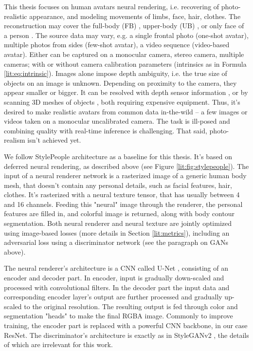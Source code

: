 This thesis focuses on human avatars neural rendering, i.e. recovering of photo-realistic appearance, and modeling movements of limbs, face, hair, clothes. The reconstruction may cover the full-body (FB)  \cite{dnn:fb-cloth-avatar21, dnn:stylepeople21, dnn:anr21}, upper-body (UB) \cite{dnn:upper-avatar21}, or only face of a person \cite{dnn:volumetric-primitives21, dnn:hyperstyle21}. The source data may vary, e.g. a single frontal photo (one-shot avatar), multiple photos from sides (few-shot avatar), a video sequence (video-based avatar). Either can be captured on a monocular camera\cite{dnn:stylepeople21}, stereo camera\cite{dnn:stereo-avatars11}, multiple cameras\cite{dnn:volumetric-primitives21, dnn:textured-avatars19}; with or without camera calibration parameters (intrinsics as in Formula \ref{lit:eq:intrinsic}). Images alone impose depth ambiguity, i.e. the true size of objects on an image is unknown. Depending on proximity to the camera, they appear smaller or bigger. It can be resolved with depth sensor information \cite{dnn:depth-avatar11}, or by scanning 3D meshes of objects \cite{dnn:phorhum22}, both requiring expensive equipment. Thus, it's desired to make realistic avatars from common data in-the-wild -- a few images or videos taken on a monocular uncalibrated camera. The task is ill-posed and combining quality with real-time inference is challenging. That said, photo-realism isn't achieved yet. 

We follow StylePeople \cite{dnn:stylepeople21} architecture as a baseline for this thesis. It's based on deferred neural rendering, as described above (see Figure \ref{lit:fig:stylepeople}). The input of a neural renderer network is a rasterized image of a generic human body mesh, that doesn't contain any personal details, such as facial features, hair, clothes. It's rasterized with a neural texture tensor, that has usually between 4 and 16 channels. Feeding this "neural" image through the renderer, the personal features are filled in, and colorful image is returned, along with body contour segmentation. Both neural renderer and neural texture are jointly optimized using image-based losses (more details in Section \ref{lit:metrics}), including an adversarial loss using a discriminator network (see the paragraph on GANs above). 

The neural renderer's architecture is a CNN called U-Net \cite{dnn:unet15}, consisting of an encoder and decoder part. In encoder, input is gradually down-scaled and processed with convolutional filters. In the decoder part the input data and corresponding encoder layer's output are further processed and gradually up-scaled to the original resolution. The resulting output is fed through color and segmentation "heads" to make the final RGBA image. Commonly to improve training, the encoder part is replaced with a powerful CNN backbone, in our case ResNet\cite{dnn:resnet-unet20,dnn:resnet16}. The discriminator's architecture is exactly as in StyleGANv2 \cite{dnn:stylegan-v2-20}, the details of which are irrelevant for this work.

